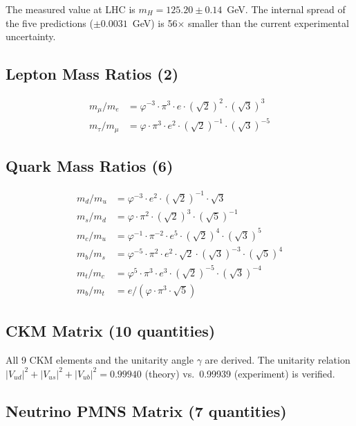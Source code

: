 \documentclass[12pt,a4paper]{article}
\begin{document}
The measured value at LHC is $m_H = 125.20 \pm 0.14$~GeV. The internal spread of the five predictions ($\pm 0.0031$~GeV) is 56$\times$ smaller than the current experimental uncertainty.

\subsection{Lepton Mass Ratios (2)}

\begin{align}
m_\mu / m_e &= \varphi^{-3} \cdot \pi^3 \cdot e \cdot (\sqrt{2})^2 \cdot (\sqrt{3})^3 \\
m_\tau / m_\mu &= \varphi \cdot \pi^3 \cdot e^2 \cdot (\sqrt{2})^{-1} \cdot (\sqrt{3})^{-5}
\end{align}

\subsection{Quark Mass Ratios (6)}

\begin{align}
m_d / m_u &= \varphi^{-3} \cdot e^2 \cdot (\sqrt{2})^{-1} \cdot \sqrt{3} \\
m_s / m_d &= \varphi \cdot \pi^2 \cdot (\sqrt{2})^3 \cdot (\sqrt{5})^{-1} \\
m_c / m_u &= \varphi^{-1} \cdot \pi^{-2} \cdot e^5 \cdot (\sqrt{2})^4 \cdot (\sqrt{3})^5 \\
m_b / m_s &= \varphi^{-5} \cdot \pi^2 \cdot e^2 \cdot \sqrt{2} \cdot (\sqrt{3})^{-3} \cdot (\sqrt{5})^4 \\
m_t / m_c &= \varphi^5 \cdot \pi^3 \cdot e^3 \cdot (\sqrt{2})^{-5} \cdot (\sqrt{3})^{-4} \\
m_b / m_t &= e / (\varphi \cdot \pi^3 \cdot \sqrt{5})
\end{align}

\subsection{CKM Matrix (10 quantities)}

All 9 CKM elements and the unitarity angle $\gamma$ are derived. The unitarity relation $|V_{ud}|^2 + |V_{us}|^2 + |V_{ub}|^2 = 0.99940$ (theory) vs.\ 0.99939 (experiment) is verified.

\subsection{Neutrino PMNS Matrix (7 quantities)}
\end{document}
